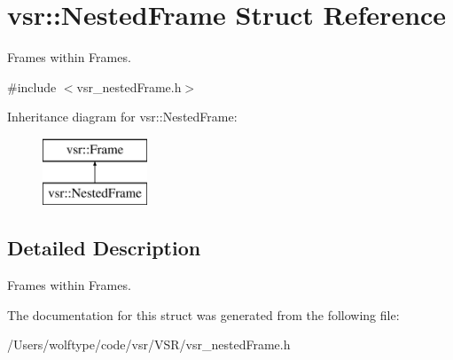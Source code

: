 \hypertarget{structvsr_1_1_nested_frame}{\section{vsr\-:\-:Nested\-Frame Struct Reference}
\label{structvsr_1_1_nested_frame}
}


Frames within Frames.  




{\ttfamily \#include $<$vsr\-\_\-nested\-Frame.\-h$>$}

Inheritance diagram for vsr\-:\-:Nested\-Frame\-:\begin{figure}[H]
\begin{center}
\leavevmode
\includegraphics[height=2.000000cm]{structvsr_1_1_nested_frame}
\end{center}
\end{figure}


\subsection{Detailed Description}
Frames within Frames. 

The documentation for this struct was generated from the following file\-:\begin{DoxyCompactItemize}
\item 
/\-Users/wolftype/code/vsr/\-V\-S\-R/vsr\-\_\-nested\-Frame.\-h\end{DoxyCompactItemize}
